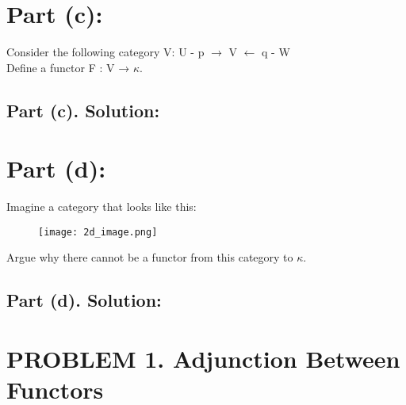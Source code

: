 \documentclass{article}
\begin{document}
\newpage

\section*{Part (c):} Consider the following category V:
U - p $\rightarrow$ V $\leftarrow$ q - W \\
Define a functor F : V → $\kappa$.


\subsection*{Part (c). Solution:}


\newpage

\section*{Part (d):} Imagine a category that looks like this:
\begin{figure}[h!]
    \centering
    \texttt{[image: 2d\_image.png]} %
    \label{fig:sample-image}
\end{figure} 

Argue why there cannot be a functor from this category to $\kappa$.

\subsection*{Part (d). Solution:}






\newpage

\section*{PROBLEM 1. Adjunction Between Functors  }
\end{document}
